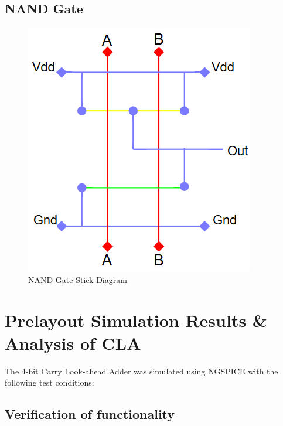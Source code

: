 \documentclass[conference]{IEEEtran}
\begin{document}
\subsection{NAND Gate}
\begin{figure}[H]
    \centering
    \includegraphics[width=0.5\linewidth]{sticknand.png}
    \caption{NAND Gate Stick Diagram}
    \label{fig:nand}
\end{figure}


\section{Prelayout Simulation Results \& Analysis of CLA}
The 4-bit Carry Look-ahead Adder was simulated using NGSPICE with the following test conditions:

\subsection{Verification of functionality}
\end{document}
